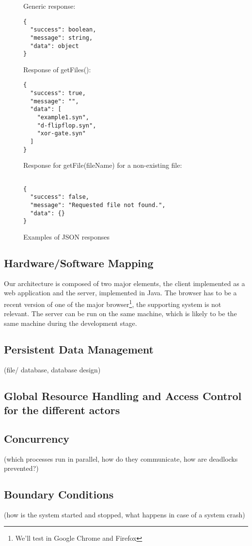\documentclass[a4paper]{article}
\begin{document}
\begin{figure}[h!]
\caption{Examples of JSON responses}
Generic response:
\begin{verbatim}
{
  "success": boolean,
  "message": string,
  "data": object
}
\end{verbatim}
Response of getFiles(): \begin{verbatim}
{
  "success": true,
  "message": "",
  "data": [
    "example1.syn",
    "d-flipflop.syn",
    "xor-gate.syn"
  ]
}
\end{verbatim}
Response for getFile(fileName) for a non-existing file:
\begin{verbatim}

{
  "success": false,
  "message": "Requested file not found.",
  "data": {}
}
\end{verbatim}
\end{figure}

\subsection{Hardware/Software Mapping}
Our architecture is composed of two major elements, the client implemented as a web application and the server, implemented in Java. The browser has to be a recent version of one of the major browser\footnote{We'll test in Google Chrome and Firefox}, the supporting system is not relevant. The server can be run on the same machine, which is likely to be the same machine during the development stage.

\subsection{Persistent Data Management}
(file/ database, database design)
\subsection{Global Resource Handling and Access Control for the different actors}
\subsection{Concurrency}
(which processes run in parallel, how do they communicate, how are deadlocks prevented?)
\subsection{Boundary Conditions}
(how is the system started and stopped, what happens
in case of a system crash)
\end{document}
